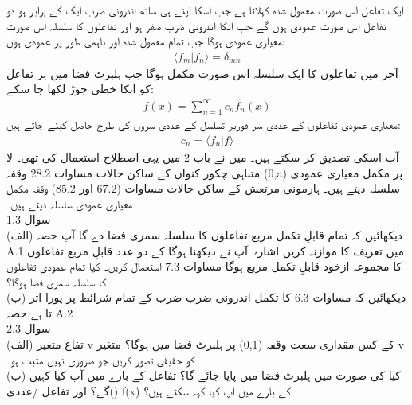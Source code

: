 ایک تفاعل اس صورت معمول شدہ کہلاتا ہے جب اسکا اپنے ہی ساتھ اندرونی ضرب ایک کے برابر ہو دو تفاعل اس صورت عمودی ہوں گے جب انکا اندرونی ضرب صفر ہو اور تفاعلوں کا سلسلہ اس صورت معیاری عمودی ہوگا جب تمام معمول شدہ اور باہمی طور پر عمودی ہوں:
\begin{align}
	\langle f_m | f_n \rangle = \delta_{mn}
\end{align}
آخر میں تفاعلوں کا ایک سلسلہ اس صورت مکمل ہوگا جب ہلبرٹ فضا میں ہر تفاعل کو انکا خطی جوڑ لکھا جا سکے:
\begin{align}
	f(x) = \sum\limits_{n=1}^\infty c_{n} f_{n}(x)
\end{align}
معیاری عمودی تفاعلوں 
 کے عددی سر فوریر تسلسل کے عددی سروں کی طرح حاصل کیئے جاتے ہیں:
\begin{align}
	c_{n} = \langle f_{n} | f \rangle
\end{align}
آپ اسکی تصدیق کر سکتے ہیں۔ میں نے باب 2 میں یہی اصطلاح استعمال کی تھی۔ لا متناہی چکور کنواں کے ساکن حالات مساوات 28.2 وقفہ (0,a) پر مکمل معیاری عمودی سلسلہ دیتے ہیں۔ ہارمونی مرتعش کے ساکن حالات مساوات (67.2 اور 85.2) وقفہ  مکمل معیاری عمودی سلسلہ دیتے ہیں۔\\
سوال 1.3\\
(الف) دیکھائیں کہ تمام قابلِ تکمل مربع تفاعلوں کا سلسلہ سمری فضا دے گا آپ حصہ A.1 میں تعریف کا موازنہ کریں اشارہ: آپ نے دیکھنا ہوگا کے دو عدد قابلِ مربع تفاعلوں کا مجموعہ ازخود قابلِ تکمل مربع ہوگا مساوات 7.3 استعمال کریں۔ کیا تمام عمودی تفاعلوں کا سلسلہ سمری فضا ہوگا؟\\
(ب) دیکھائیں کہ مساوات 6.3 کا تکمل اندرونی ضرب ضرب کے تمام شرائط پر پورا اتر تا ہے حصہ A.2۔\\
سوال 2.3\\
(الف) تفاع   متغیر v کے کس مقداری سعت وقفہ (0,1) پر ہلبرٹ فضا میں ہوگا؟ متغیر v کو حقیقی تصور کریں جو ضروری نہیں مثبت ہو۔\\
(ب) کیا  کی صورت میں  ہلبرٹ فضا میں پایا جائے گا؟ تفاعل 
  کے بارے میں آپ کیا کہیں گے؟ اور تفاعل /عددی{() f(x)} کے بارے میں آپ کیا کہہ سکتے ہیں؟


